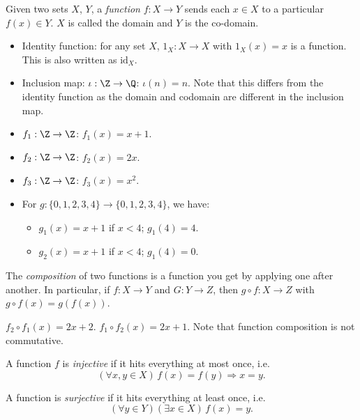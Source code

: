 \documentclass[a4paper]{article}
\begin{document}
\begin{defi}[Function]
  Given two sets $X$, $Y$, a \emph{function} $f: X \rightarrow Y$ sends each $x\in X$ to a particular $f(x)\in Y$. $X$ is called the domain and $Y$ is the co-domain.
\end{defi}
\begin{eg}\leavevmode
  \begin{itemize}
    \item Identity function: for any set $X$, $1_X: X \rightarrow X$ with $1_X(x) = x$ is a function. This is also written as $\mathrm{id}_X$.
    \item Inclusion map: $\iota: \Z \rightarrow \Q$: $\iota(n) = n$. Note that this differs from the identity function as the domain and codomain are different in the inclusion map.
    \item $f_1: \Z \rightarrow \Z$: $f_1(x) = x + 1$.
    \item $f_2: \Z \rightarrow \Z$: $f_2(x) = 2x$.
    \item $f_3: \Z \rightarrow \Z$: $f_3(x) = x^2$.
    \item For $g: \{0, 1, 2, 3, 4\} \rightarrow \{0, 1, 2, 3, 4\}$, we have:
      \begin{itemize}
        \item $g_1(x) = x + 1$ if $x < 4$; $g_1(4) = 4$.
        \item $g_2(x) = x + 1$ if $x < 4$; $g_1(4) = 0$.
      \end{itemize}
  \end{itemize}
\end{eg}
\begin{defi}
  The \emph{composition} of two functions is a function you get by applying one after another. In particular, if $f: X \rightarrow Y$ and $G: Y\rightarrow Z$, then $g\circ f: X \rightarrow Z$ with $g\circ f(x) = g(f(x))$.
\end{defi}
\begin{eg}
  $f_2\circ f_1(x) = 2x + 2$. $f_1\circ f_2 (x) = 2x + 1$. Note that function composition is not commutative.
\end{eg}
\begin{defi}
  A function $f$ is \emph{injective} if it hits everything at most once, i.e.
  \[
    (\forall x, y\in X)\,f(x) = f(y)\Rightarrow x = y.
  \]
\end{defi}

\begin{defi}
  A function is \emph{surjective} if it hits everything at least once, i.e.
  \[
    (\forall y\in Y)(\exists x\in X)\,f(x) = y.
  \]
\end{defi}
\end{document}
